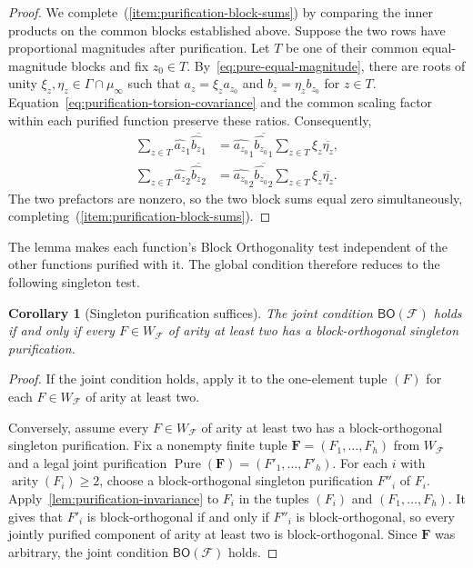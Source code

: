 \documentclass[11pt,letterpaper,onecolumn]{article}
\theoremstyle{plain}
\newtheorem{corollary}[corollary]{Corollary}
\theoremstyle{definition}
\theoremstyle{remark}
\newcommand{\cF}{\mathcal F}
\newcommand{\BO}{\mathsf{BO}}
\DeclareMathOperator{\Pure}{Pure}
\DeclareMathOperator{\arity}{arity}
\begin{document}
\begin{proof}
We complete~(\ref{item:purification-block-sums}) by comparing the inner
products on the common blocks established above.
Suppose the two rows have proportional magnitudes after
purification.
Let $T$ be one of their common equal-magnitude blocks and fix $z_0\in T$.
By~\eqref{eq:pure-equal-magnitude}, there are roots of unity
$\xi_z,\eta_z\in\Gamma\cap\mu_\infty$ such that
$a_z=\xi_z a_{z_0}$ and $b_z=\eta_z b_{z_0}$ for $z\in T$.
Equation~\eqref{eq:purification-torsion-covariance} and the common scaling
factor within each purified function preserve these ratios.
Consequently,
\begin{align*}
  \sum_{z\in T}\widehat{a_z}_{1}\overline{\widehat{b_z}_{1}}
  &=\widehat{a_{z_0}}_{1}\overline{\widehat{b_{z_0}}_{1}}
    \sum_{z\in T}\xi_z\overline{\eta_z},\\
  \sum_{z\in T}\widehat{a_z}_{2}\overline{\widehat{b_z}_{2}}
  &=\widehat{a_{z_0}}_{2}\overline{\widehat{b_{z_0}}_{2}}
    \sum_{z\in T}\xi_z\overline{\eta_z}.
\end{align*}
The two prefactors are nonzero, so the two block sums equal zero
simultaneously, completing~(\ref{item:purification-block-sums}).
\end{proof}

The lemma makes each function's Block Orthogonality test independent of
the other functions purified with it.  The global condition therefore
reduces to the following singleton test.

\begin{corollary}[Singleton purification suffices]
\label{cor:singleton-purification}
The joint condition $\BO(\cF)$ holds if and only if every
$F\in W_{\cF}$ of arity at least two has a block-orthogonal singleton
purification.
\end{corollary}

\begin{proof}
If the joint condition holds, apply it to the one-element tuple $(F)$ for
each $F\in W_{\cF}$ of arity at least two.

Conversely, assume every $F\in W_{\cF}$ of arity at least two has a
block-orthogonal singleton purification.
Fix a nonempty finite tuple $\mathbf F=(F_1,\ldots,F_h)$ from $W_{\cF}$
and a legal joint purification $\Pure(\mathbf F)=(F'_1,\ldots,F'_h)$.
For each $i$ with $\arity(F_i)\ge2$, choose a block-orthogonal singleton
purification $F''_i$ of $F_i$.
Apply~\cref{lem:purification-invariance} to $F_i$ in the tuples $(F_i)$
and $(F_1,\ldots,F_h)$.
It gives that $F'_i$ is block-orthogonal if and only if $F''_i$ is
block-orthogonal, so every jointly purified component of arity at least
two is block-orthogonal.
Since $\mathbf F$ was arbitrary, the joint condition $\BO(\cF)$ holds.
\end{proof}
\end{document}
